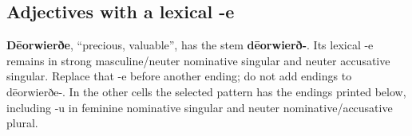\subsection*{Adjectives with a lexical -e}

\textbf{Dēorwierðe}, “precious, valuable”, has the stem \textbf{dēorwierð-}. Its lexical -e remains in strong masculine/\allowbreak{}neuter nominative singular and neuter accusative singular. Replace that -e before another ending; do not add endings to dēorwierðe-. In the other cells the selected pattern has the endings printed below, including -u in feminine nominative singular and neuter nominative/\allowbreak{}accusative plural.

